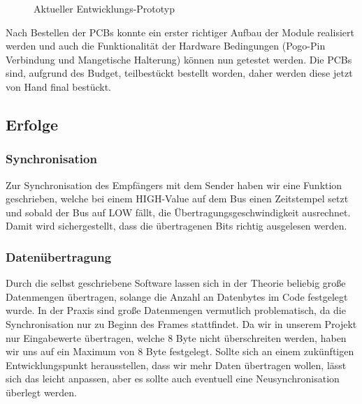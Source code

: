 \begin{figure}[H]
    \centering    
    \caption{Aktueller Entwicklungs-Prototyp}
    \label{prototyp}
\end{figure}

Nach Bestellen der PCBs konnte ein erster richtiger Aufbau der Module realisiert werden und auch die Funktionalität der Hardware Bedingungen (Pogo-Pin Verbindung und Mangetische Halterung) können nun getestet werden. Die PCBs sind, aufgrund des Budget, teilbestückt bestellt worden, daher werden diese jetzt von Hand final bestückt.

\subsection{Erfolge}
\subsubsection{Synchronisation}
Zur Synchronisation des Empfängers mit dem Sender haben wir eine Funktion geschrieben, welche bei einem HIGH-Value auf dem Bus einen Zeitstempel setzt und sobald der Bus auf LOW fällt, die Übertragungsgeschwindigkeit ausrechnet. Damit wird sichergestellt, dass die übertragenen Bits richtig ausgelesen werden.

\subsubsection{Datenübertragung}
Durch die selbst geschriebene Software lassen sich in der Theorie beliebig große Datenmengen übertragen, solange die Anzahl an Datenbytes im Code festgelegt wurde. In der Praxis sind große Datenmengen vermutlich problematisch, da die Synchronisation nur zu Beginn des Frames stattfindet. Da wir in unserem Projekt nur Eingabewerte übertragen, welche 8 Byte nicht überschreiten werden, haben wir uns auf ein Maximum von 8 Byte festgelegt. Sollte sich an einem zukünftigen Entwicklungspunkt herausstellen, dass wir mehr Daten übertragen wollen, lässt sich das leicht anpassen, aber es sollte auch eventuell eine Neusynchronisation überlegt werden. 

